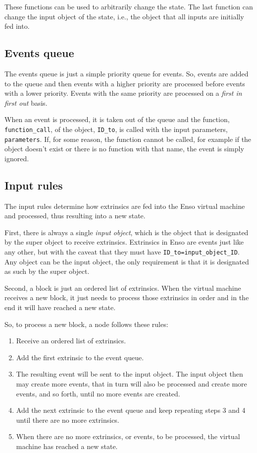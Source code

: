\documentclass[conference]{IEEEtran}
\begin{document}
These functions can be used to arbitrarily change the state. The last function can change the input object of the state, i.e., the object that all inputs are initially fed into.

\subsection{Events queue}
The events queue is just a simple priority queue for events. So, events are added to the queue and then events with a higher priority are processed before events with a lower priority. Events with the same priority are processed on a \textit{first in first out} basis.

When an event is processed, it is taken out of the queue and the function, \texttt{function\_call}, of the object, \texttt{ID\_to}, is called with the input parameters, \texttt{parameters}. If, for some reason, the function cannot be called, for example if the object doesn't exist or there is no function with that name, the event is simply ignored.

\subsection{Input rules}
The input rules determine how extrinsics are fed into the Enso virtual machine and processed, thus resulting into a new state.

First, there is always a single \textit{input object}, which is the object that is designated by the super object to receive extrinsics. Extrinsics in Enso are events just like any other, but with the caveat that they must have \texttt{ID\_to=input\_object\_ID}. Any object can be the input object, the only requirement is that it is designated as such by the super object.

Second, a block is just an ordered list of extrinsics. When the virtual machine receives a new block, it just needs to process those extrinsics in order and in the end it will have reached a new state.

So, to process a new block, a node follows these rules:

\begin{enumerate}
	\item Receive an ordered list of extrinsics.
	\item Add the first extrinsic to the event queue.
	\item The resulting event will be sent to the input object. The input object then may create more events, that in turn will also be processed and create more events, and so forth, until no more events are created.
	\item Add the next extrinsic to the event queue and keep repeating steps 3 and 4 until there are no more extrinsics.
	\item When there are no more extrinsics, or events, to be processed, the virtual machine has reached a new state.
\end{enumerate}
\end{document}
